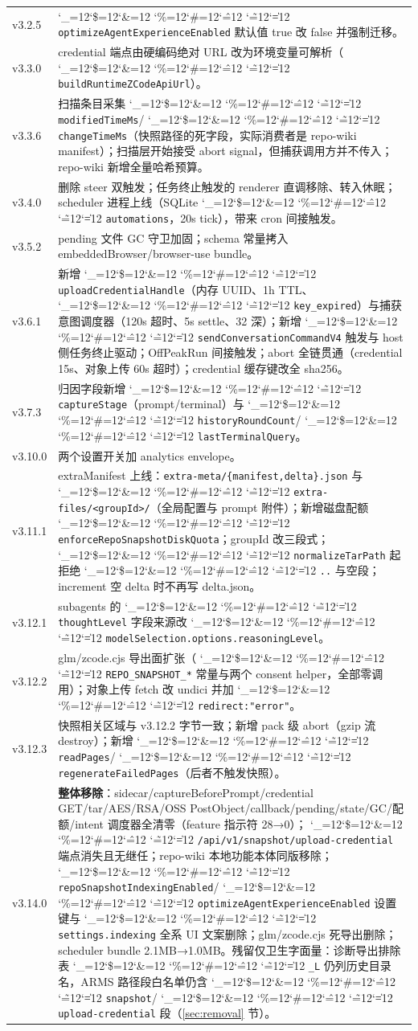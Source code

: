 \documentclass[11pt,a4paper,fontset=none]{ctexart}
\newcommand{\cid}{%
  \begingroup
  \catcode`\_=12\relax \catcode`\$=12\relax \catcode`\&=12\relax
  \catcode`\%=12\relax \catcode`\#=12\relax \catcode`\^=12\relax
  \catcode`\~=12\relax \catcode`\|=12\relax
  \codeSpan}
\newcommand{\codeSpan}[1]{{\small\texttt{#1}}\endgroup}
\begin{document}
\begin{longtable}{@{}p{2.2cm}p{13.0cm}@{}}
v3.2.5 & \cid{optimizeAgentExperienceEnabled} 默认值 true 改 false 并强制迁移。 \\
v3.3.0 & credential 端点由硬编码绝对 URL 改为环境变量可解析（\cid{buildRuntimeZCodeApiUrl}）。 \\
v3.3.6 & 扫描条目采集 \cid{modifiedTimeMs}/\cid{changeTimeMs}（快照路径的死字段，实际消费者是 repo-wiki manifest）；扫描层开始接受 abort signal，但捕获调用方并不传入；repo-wiki 新增全量哈希预算。 \\
v3.4.0 & 删除 steer 双触发；任务终止触发的 renderer 直调移除、转入休眠；scheduler 进程上线（SQLite \cid{automations}，20s tick），带来 cron 间接触发。 \\
v3.5.2 & pending 文件 GC 守卫加固；schema 常量拷入 embeddedBrowser/browser-use bundle。 \\
v3.6.1 & 新增 \cid{uploadCredentialHandle}（内存 UUID、1h TTL、\cid{key_expired}）与捕获意图调度器（120s 超时、5s settle、32 深）；新增 \cid{sendConversationCommandV4} 触发与 host 侧任务终止驱动；OffPeakRun 间接触发；abort 全链贯通（credential 15s、对象上传 60s 超时）；credential 缓存键改全 sha256。 \\
v3.7.3 & 归因字段新增 \cid{captureStage}（prompt/terminal）与 \cid{historyRoundCount}/\cid{lastTerminalQuery}。 \\
v3.10.0 & 两个设置开关加 analytics envelope。 \\
v3.11.1 & extraManifest 上线：\verb+extra-meta/{manifest,delta}.json+ 与 \cid{extra-files/<groupId>/}（全局配置与 prompt 附件）；新增磁盘配额 \cid{enforceRepoSnapshotDiskQuota}；groupId 改三段式；\cid{normalizeTarPath} 起拒绝 \cid{..} 与空段；increment 空 delta 时不再写 delta.json。 \\
v3.12.1 & subagents 的 \cid{thoughtLevel} 字段来源改 \cid{modelSelection.options.reasoningLevel}。 \\
v3.12.2 & glm/zcode.cjs 导出面扩张（\cid{REPO_SNAPSHOT_*} 常量与两个 consent helper，全部零调用）；对象上传 fetch 改 undici 并加 \cid{redirect:"error"}。 \\
v3.12.3 & 快照相关区域与 v3.12.2 字节一致；新增 pack 级 abort（gzip 流 destroy）；新增 \cid{readPages}/\cid{regenerateFailedPages}（后者不触发快照）。 \\
v3.14.0 & \textbf{整体移除}：sidecar/captureBeforePrompt/credential GET/tar/AES/RSA/OSS PostObject/callback/pending/state/GC/配额/intent 调度器全清零（feature 指示符 28→0）；\cid{/api/v1/snapshot/upload-credential} 端点消失且无继任；repo-wiki 本地功能本体同版移除；\cid{repoSnapshotIndexingEnabled}/\allowbreak\cid{optimizeAgentExperienceEnabled} 设置键与 \cid{settings.indexing} 全系 UI 文案删除；glm/zcode.cjs 死导出删除；scheduler bundle 2.1MB→1.0MB。残留仅卫生字面量：诊断导出排除表 \cid{_L} 仍列历史目录名，ARMS 路径段白名单仍含 \cid{snapshot}/\cid{upload-credential} 段（\ref{sec:removal} 节）。 \\
\end{longtable}
\end{document}

